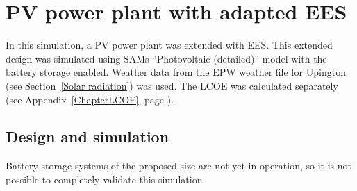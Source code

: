 \chapter{PV power plant with adapted EES}

In this simulation, a \acl{PV} power plant was extended with \acf{EES}. This extended design was simulated using \acp{SAM} \enquote{Photovoltaic (detailed)} model with the battery storage enabled. Weather data from the EPW weather file for Upington (see Section~\ref{Solar radiation}) was used. The \ac{LCOE} was calculated separately (see Appendix~\ref{ChapterLCOE}, page \pageref{ChapterLCOE}).

\section{Design and simulation} \label{section PV system}
Battery storage systems of the proposed size are not yet in operation, so it is not possible to completely validate this simulation.


